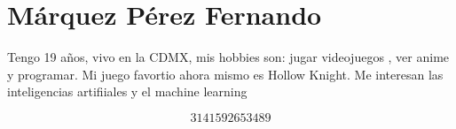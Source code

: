 \chapter{Márquez Pérez Fernando}
Tengo 19 años, vivo en la CDMX, mis hobbies son: jugar videojuegos , ver anime y programar. Mi juego favortio ahora mismo es Hollow Knight. Me interesan las inteligencias artifiiales y el machine learning

\[3141592653489\]

